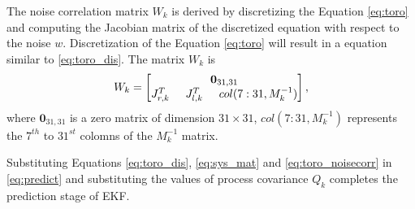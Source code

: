 The noise correlation matrix $W_k$ is derived by discretizing the Equation \ref{eq:toro} and computing the Jacobian matrix of the discretized equation with respect to the noise $w$. Discretization of the Equation \ref{eq:toro} will result in a equation similar to \ref{eq:toro_dis}. The matrix $W_k$ is 
\begin{equation}
    \label{eq:toro_noisecorr}
    W_k =  \begin{bmatrix}
        \textbf{0}_{31,31} \\ 
        J_{r,k}^T \hspace{5mm} J_{l,k}^T \hspace{5mm} col(7:31,M_k^{-1})
        \end{bmatrix},
\end{equation}
where $\textbf{0}_{31,31}$ is a zero matrix of dimension $31 \times 31$, $col(7:31,M_k^{-1})$ represents the $7^{th}$ to ${31}^{st}$ colomns of the $M_k^{-1}$ matrix.

Substituting Equations \ref{eq:toro_dis}, \ref{eq:sys_mat} and \ref{eq:toro_noisecorr} in \ref{eq:predict} and substituting the values of process covariance $Q_k$ completes the prediction stage of EKF.
